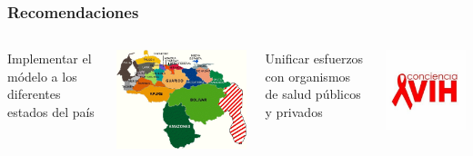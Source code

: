 \documentclass{beamer}%
\begin{document}
\begin{frame}
\frametitle{\textbf{Recomendaciones}}
\begin{columns}[t]
	Implementar el m\'odelo a los diferentes estados del pa\'is
	\begin{center}\includegraphics[height=0.4\textheight]{venezuela.jpg}\end{center}
    Unificar esfuerzos con organismos de salud p\'ublicos y privados
   \begin{center}\includegraphics[height=0.4\textheight]{conciencia.jpg}\end{center}
  \end{columns}
\end{frame}
\end{document}
